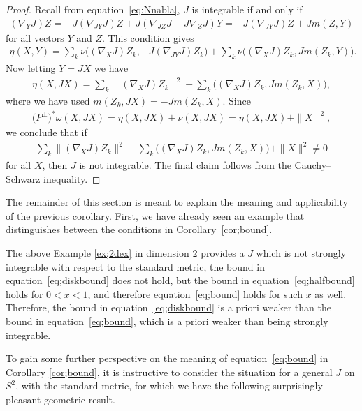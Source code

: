\documentclass[10pt,a4paper]{amsart}
\numberwithin{equation}{section}
\begin{document}
\begin{proof}Recall from equation~\eqref{eq:Nnabla}, $J$ is integrable if and only if
\begin{gather*}
 (\nabla_Y J) Z = -J (\nabla_{JY} J ) Z + J (\nabla_{JZ} J - J \nabla_Z J)Y = -J ( \nabla_{JY} J) Z + Jm(Z,Y)
\end{gather*}
for all vectors $Y$ and $Z$. This condition gives
\begin{gather*}
\eta(X,Y)=\sum_k \nu \big((\nabla_X J) Z_k, -J ( \nabla_{JY} J ) Z_k\big)+\sum_k \nu \big( (\nabla_X J) Z_k, J m(Z_k,Y) \big).
\end{gather*}
Now letting $Y=JX$ we have
\begin{gather*}
\eta(X,JX) = \sum_k \| (\nabla_X J) Z_k \|^2- \sum_k \big( (\nabla_X J) Z_k, Jm(Z_k,X) \big),
\end{gather*}
where we have used $m(Z_k,JX) = -Jm(Z_k,X)$. Since
\begin{gather*}
\big(P^\perp\big)^*\omega(X,JX) =\eta(X,JX) + \nu( X , JX ) = \eta(X,JX) + \|X\|^2,
\end{gather*}
we conclude that if
\begin{gather*}
 \sum_k \| (\nabla_X J) Z_k \|^2-\sum_k \big( (\nabla_X J) Z_k, Jm(Z_k,X) \big) + \|X\|^2 \neq 0
\end{gather*}
for all $X$, then $J$ is not integrable. The final claim follows from the Cauchy--Schwarz inequa\-lity.
\end{proof}

The remainder of this section is meant to explain the meaning and applicability of the previous corollary. First, we have already seen an example that distinguishes between the conditions in Corollary~\ref{cor;bound}.

\begin{ex} The above Example \ref{ex;2dex} in dimension $2$ provides a $J$ which is not strongly integrable with respect to the standard metric, the bound in equation~\eqref{eq;diskbound} does not hold, but the bound in equation~\eqref{eq;halfbound} holds for $0 < x < 1$, and therefore equation~\eqref{eq;bound} holds for such $x$ as well. Therefore, the bound in equation~\eqref{eq;diskbound} is a priori weaker than the bound in equation~\eqref{eq;bound}, which is a priori weaker than being strongly integrable.
\end{ex}

 To gain some further perspective on the meaning of equation~\eqref{eq;bound} in Corollary \ref{cor;bound}, it is instructive to consider the situation for a general $J$ on $S^2$, with the standard metric, for which we have the following surprisingly pleasant geometric result.
\end{document}
